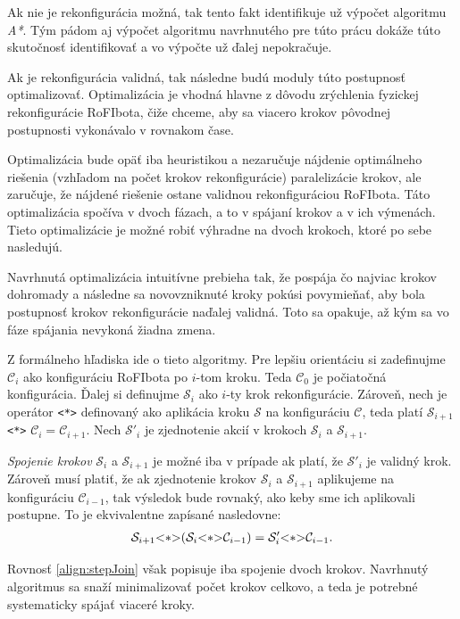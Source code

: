\documentclass[
  digital, %
  oneside, %
  table,   %
  lof,     %
  nolot,     %
]{fithesis3}
\begin{document}
Ak nie je rekonfigurácia možná, tak tento fakt identifikuje už výpočet algoritmu \textit{A*}. Tým pádom aj výpočet algoritmu navrhnutého pre túto prácu dokáže túto skutočnosť identifikovať a vo výpočte už ďalej nepokračuje. 

Ak je rekonfigurácia validná, tak následne budú moduly túto postupnosť optimalizovať. Optimalizácia je vhodná hlavne z dôvodu zrýchlenia fyzickej rekonfigurácie RoFIbota, čiže chceme, aby sa viacero krokov pôvodnej postupnosti vykonávalo v rovnakom čase. 

Optimalizácia bude opäť iba heuristikou a nezaručuje nájdenie optimálneho riešenia (vzhľadom na počet krokov rekonfigurácie) paralelizácie krokov, ale zaručuje, že nájdené riešenie ostane validnou rekonfiguráciou RoFIbota. Táto optimalizácia spočíva v dvoch fázach, a to v spájaní krokov a v ich výmenách. Tieto optimalizácie je možné robiť výhradne na dvoch krokoch, ktoré po sebe nasledujú. 

Navrhnutá optimalizácia intuitívne prebieha tak, že pospája čo najviac krokov dohromady a následne sa novovzniknuté kroky pokúsi povymieňať, aby bola postupnosť krokov rekonfigurácie naďalej validná. Toto sa opakuje, až kým sa vo fáze spájania nevykoná žiadna zmena. 

Z formálneho hľadiska ide o tieto algoritmy. Pre lepšiu orientáciu si zadefinujme $\mathcal{C}_i$ ako konfiguráciu RoFIbota po $i$-tom kroku. Teda $\mathcal{C}_0$ je počiatočná konfigurácia. Ďalej si definujme $\mathcal{S}_i$ ako $i$-ty krok rekonfigurácie. Zároveň, nech je operátor \lstinline{<*>} definovaný ako aplikácia kroku $\mathcal{S}$ na konfiguráciu $\mathcal{C}$, teda platí $\mathcal{S}_{i + 1}$ \lstinline{<*>} $\mathcal{C}_i = \mathcal{C}_{i + 1}$. Nech $\mathcal{S}'_i$ je zjednotenie akcií v krokoch $\mathcal{S}_i$ a $\mathcal{S}_{i + 1}$. 

\textit{Spojenie krokov} $\mathcal{S}_i$ a $\mathcal{S}_{i + 1}$ je možné iba v prípade ak platí, že $\mathcal{S}'_i$ je validný krok. Zároveň musí platiť, že ak zjednotenie krokov $\mathcal{S}_i$ a $\mathcal{S}_{i + 1}$ aplikujeme na konfiguráciu $\mathcal{C}_{i - 1}$, tak výsledok bude rovnaký, ako keby sme ich aplikovali postupne. To je ekvivalentne zapísané nasledovne: 
\begin{align}
\label{align:stepJoin}
\mathcal{S}_{i + 1} \lstinline{<*>} (\mathcal{S}_i \lstinline{<*>} \mathcal{C}_{i - 1}) = \mathcal{S}'_i \lstinline{<*>} \mathcal{C}_{i - 1}. 
\end{align}

Rovnosť \ref{align:stepJoin} však popisuje iba spojenie dvoch krokov. Navrhnutý algoritmus sa snaží minimalizovať počet krokov celkovo, a teda je potrebné systematicky spájať viaceré kroky. 
\end{document}
